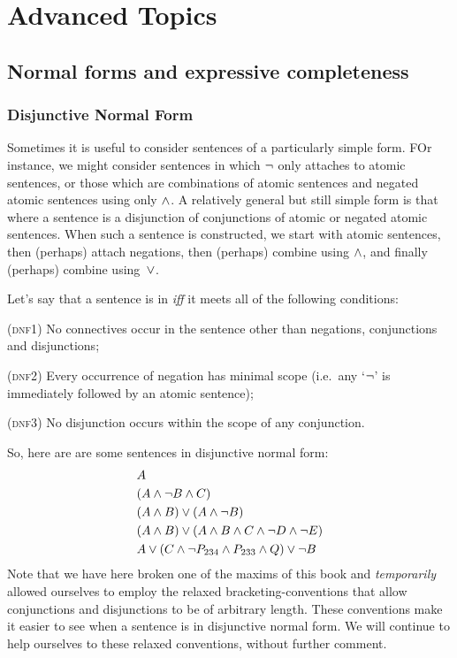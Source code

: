 \part{Advanced Topics}

\chapter{Normal forms and expressive completeness}
\label{ch:normalform}

\section{Disjunctive Normal Form}\label{s:DNFDefined}

Sometimes it is useful to consider sentences of a particularly simple form. FOr instance, we might consider sentences in which $\neg$ only attaches to atomic sentences, or those which are combinations of atomic sentences and negated atomic sentences using only $\wedge$.  A relatively general but still simple form is that where a sentence is a disjunction of conjunctions of atomic or negated atomic sentences.  When such a sentence is constructed, we start with atomic sentences, then (perhaps) attach negations, then (perhaps) combine using $\wedge$, and finally (perhaps) combine using~$\vee$. 

Let's say that a sentence is in  \emph{iff} it meets all of the following conditions:
	\begin{earg}
		\item[(\textsc{dnf1})] No connectives occur in the sentence other than negations, conjunctions and disjunctions;
		\item[(\textsc{dnf2})] Every occurrence of negation has minimal scope (i.e.\ any `$\neg$' is immediately followed by an atomic sentence);
		\item[(\textsc{dnf3})] No disjunction occurs within the scope of any conjunction.
	\end{earg}
So, here are are some sentences in disjunctive normal form:
\begin{align*}
  & A \\
  & (A \wedge \lnot B \wedge C)\\
  & (A \wedge B) \vee (A \wedge \neg B)\\
  & (A \wedge B) \vee (A \wedge  B \wedge C \wedge \neg D \wedge \neg E)\\
  & A \vee (C \wedge \neg P_{234} \wedge P_{233} \wedge Q) \vee \neg B
\end{align*}
Note that we have here broken one of the maxims of this book and \emph{temporarily} allowed ourselves to employ the relaxed bracketing-conventions that allow conjunctions and disjunctions to be of arbitrary length. These conventions make it easier to see when a sentence is in disjunctive normal form. We will continue to help ourselves to these relaxed conventions, without further comment.

